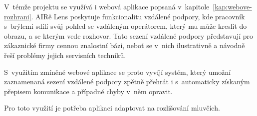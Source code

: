 V~témže projektu se využívá i webová aplikace popsaná
v~kapitole~\ref{kap:webove-rozhrani}. AIR\^{e} Lens poskytuje funkcionalitu
vzdálené podpory, kde pracovník s~brýlemi sdílí svůj pohled se vzdáleným
operátorem, který mu může kreslit do obrazu, a se kterým vede rozhovor. Tato
sezení vzdálené podpory představují pro zákaznické firmy cennou znalostní bázi,
neboť se v~nich ilustrativně a návodně řeší problémy jejich servisních techniků.

S~využitím zmíněné webové aplikace se proto vyvíjí systém, který umožní
zaznamenaná sezení vzdálené podpory zpětně přehrát i s~automaticky získaným
přepisem komunikace a případné chyby v~něm opravit.

Pro toto využití je potřeba aplikaci adaptovat na rozlišování mluvčích.
